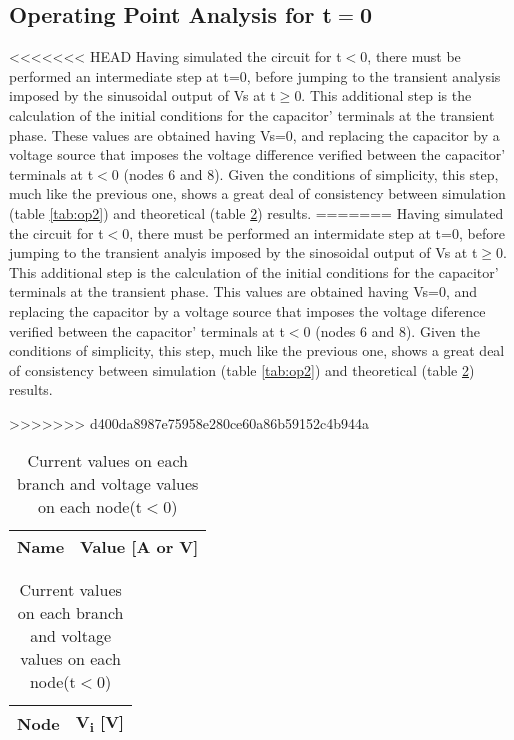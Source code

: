 \subsection{Operating Point Analysis for t$=$0}

<<<<<<< HEAD
Having simulated the circuit for t$<$0, there must be performed an intermediate step at t=0, before jumping to the transient analysis imposed by the sinusoidal output of Vs at t$\geq$0. This additional step is the calculation of the initial conditions for the capacitor' terminals at the transient phase. These values are obtained having Vs=0, and replacing the capacitor by a voltage source that imposes the voltage difference verified between the capacitor' terminals at t$<$0 (nodes 6 and 8). Given the conditions of simplicity, this step, much like the previous one, shows a great deal of consistency between simulation (table \ref{tab:op2}) and theoretical (table \ref{comp2}) results. 
=======
Having simulated the circuit for t$<$0, there must be performed an intermidate step at t=0, before jumping to the transient analyis imposed by the sinosoidal output of Vs at t$\geq$0. This additional step is the calculation of the initial conditions for the capacitor' terminals at the transient phase. This values are obtained having Vs=0, and replacing the capacitor by a voltage source that imposes the voltage diference verified between the capacitor' terminals at t$<$0 (nodes 6 and 8). Given the conditions of simplicity, this step, much like the previous one, shows a great deal of consistency between simulation (table \ref{tab:op2}) and theoretical (table \ref{comp2}) results.

\newpage
>>>>>>> d400da8987e75958e280ce60a86b59152c4b944a

\begin{table}[!htb]
  \begin{minipage}{.5\linewidth}
     \centering
  \begin{tabular}{|l|r|}
    \hline    
    {\bf Name} & {\bf Value [A or V]} \\ \hline
    
 \end{tabular}
 \caption{Simulation results. A variable preceded by @ is of type {\em current}
   and expressed in Ampere; other variables are of type {\it voltage} and expressed in
   Volt.}
 \label{tab:op2}
  \end{minipage}%
  \hspace{3mm}
    \begin{minipage}{.5\linewidth}
      \centering
        \begin{tabular}{|c|c|}
        \hline    
        {\bf Node} & {\bf V\textsubscript{i} [V]} \\ \hline
        
        \end{tabular}
        \caption{Current values on each branch and voltage values on each node(t$<$0)}
        \label{comp2}
    \end{minipage} 
\end{table}


